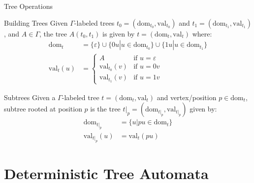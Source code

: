 \documentclass[10pt,svgnames,fragile]{beamer}
\begin{document}
\begin{frame}{Tree Operations}
  \begin{block}{Building Trees}
    Given $\Gamma$-labeled trees $t_0 = (\text{dom}_{t_0}, \text{val}_{t_0})$ and $t_1 = (\text{dom}_{t_1}, \text{val}_{t_1})$, and $A \in \Gamma$, the tree $A(t_0, t_1)$ is given by $t = (\text{dom}_t, \text{val}_t)$ where:
    \begin{align*}
      \text{dom}_t &= \{\varepsilon\} \cup \{0u | u \in \text{dom}_{t_0}\} \cup \{1u | u \in \text{dom}_{t_1}\} \\
      \text{val}_t(u) &= 
      \begin{cases}
        A & \text{if } u = \varepsilon \\
        \text{val}_{t_0}(v) & \text{if } u = 0v \\
        \text{val}_{t_1}(v) & \text{if } u = 1v
      \end{cases}
    \end{align*}
  \end{block}
  
  \pause
  
  \begin{block}{Subtrees}
    Given a $\Gamma$-labeled tree $t = (\text{dom}_t, \text{val}_t)$ and vertex/position $p \in \text{dom}_t$, subtree rooted at position $p$ is the tree $t|_p = (\text{dom}_{t|_p}, \text{val}_{t|_p})$ given by:
    \begin{align*}
      \text{dom}_{t|_p} &= \{u | pu \in \text{dom}_t\} \\
      \text{val}_{t|_p}(u) &= \text{val}_t(pu)
    \end{align*}
  \end{block}
\end{frame}

\section{Deterministic Tree Automata}
\end{document}
